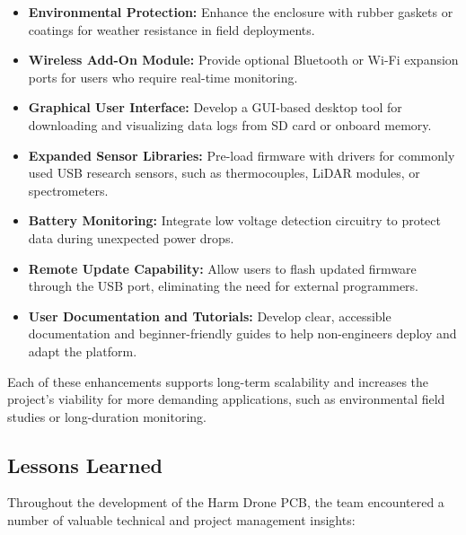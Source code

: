 \documentclass[12pt]{article}
\begin{document}
\begin{itemize}
\item \textbf{Environmental Protection:} Enhance the enclosure with rubber gaskets or coatings for weather resistance in field deployments.
\item \textbf{Wireless Add-On Module:} Provide optional Bluetooth or Wi-Fi expansion ports for users who require real-time monitoring.
\item \textbf{Graphical User Interface:} Develop a GUI-based desktop tool for downloading and visualizing data logs from SD card or onboard memory.
\item \textbf{Expanded Sensor Libraries:} Pre-load firmware with drivers for commonly used USB research sensors, such as thermocouples, LiDAR modules, or spectrometers.
\item \textbf{Battery Monitoring:} Integrate low voltage detection circuitry to protect data during unexpected power drops.
\item \textbf{Remote Update Capability:} Allow users to flash updated firmware through the USB port, eliminating the need for external programmers.
\item \textbf{User Documentation and Tutorials:} Develop clear, accessible documentation and beginner-friendly guides to help non-engineers deploy and adapt the platform.
\end{itemize}

\par Each of these enhancements supports long-term scalability and increases the project’s viability for more demanding applications, such as environmental field studies or long-duration monitoring.

\subsection{Lessons Learned}

Throughout the development of the Harm Drone PCB, the team encountered a number of valuable technical and project management insights:
\end{document}
